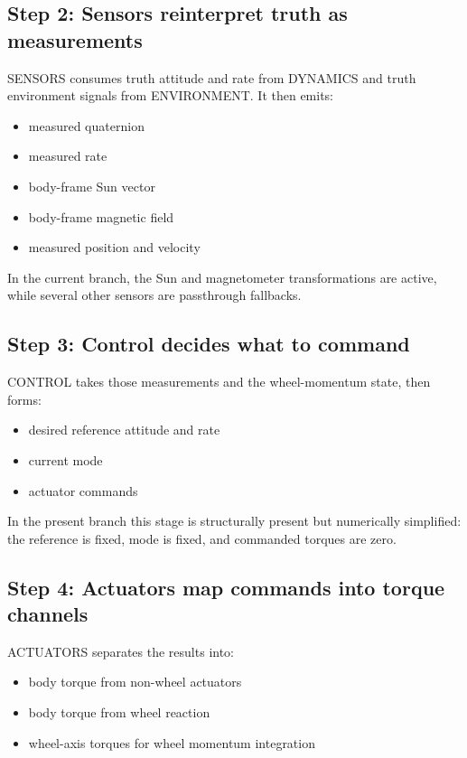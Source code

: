 \documentclass[11pt]{article}
\begin{document}
\subsection{Step 2: Sensors reinterpret truth as measurements}

SENSORS consumes truth attitude and rate from DYNAMICS and truth environment signals from ENVIRONMENT. It then emits:

\begin{itemize}
\item measured quaternion
\item measured rate
\item body-frame Sun vector
\item body-frame magnetic field
\item measured position and velocity
\end{itemize}

In the current branch, the Sun and magnetometer transformations are active, while several other sensors are passthrough fallbacks.

\subsection{Step 3: Control decides what to command}

CONTROL takes those measurements and the wheel-momentum state, then forms:

\begin{itemize}
\item desired reference attitude and rate
\item current mode
\item actuator commands
\end{itemize}

In the present branch this stage is structurally present but numerically simplified: the reference is fixed, mode is fixed, and commanded torques are zero.

\subsection{Step 4: Actuators map commands into torque channels}

ACTUATORS separates the results into:

\begin{itemize}
\item body torque from non-wheel actuators
\item body torque from wheel reaction
\item wheel-axis torques for wheel momentum integration
\end{itemize}
\end{document}
